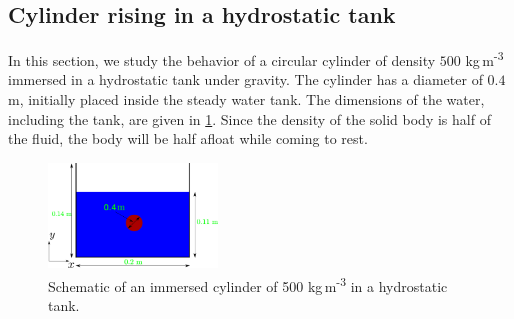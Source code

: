 



\FloatBarrier%
\subsection{Cylinder rising in a hydrostatic tank}
\label{sec:water-entry-sphere}
In this section, we study the behavior of a circular cylinder of density $500$
kg\,m\textsuperscript{-3} immersed in a hydrostatic tank under gravity. The
cylinder has a diameter of $0.4$ m, initially placed inside the steady water
tank. The dimensions of the water, including the tank, are given in
\cref{fig:water-entry-sphere-schematic}. Since the density of the solid body is
half of the fluid, the body will be half afloat while coming to rest.
\begin{figure}[!htpb]
  \centering
  \includegraphics[width=0.4\textwidth]{images/rfc/images/water_entry_of_sphere/schematic}
  \caption{Schematic of an immersed cylinder of 500 kg\,m\textsuperscript{-3}
    in a hydrostatic tank.}
\label{fig:water-entry-sphere-schematic}
\end{figure}

